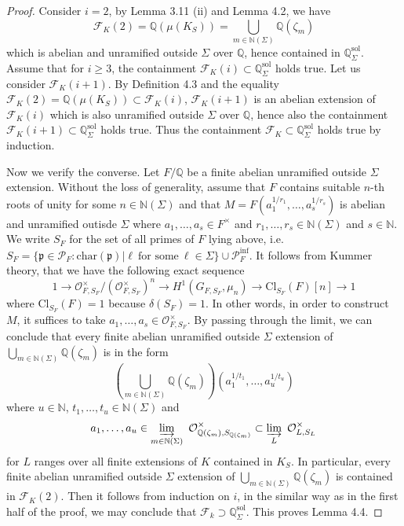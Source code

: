 \documentclass{article}
\theoremstyle{plain}
\theoremstyle{definition}
\theoremstyle{remark}
\begin{document}
\begin{proof}
Consider $i = 2$, by Lemma 3.11 (ii) and Lemma 4.2, we have
$$
\mathcal{F}_K(2) = \mathbb Q(\mu(K_S)) = \bigcup_{m \in \mathbb N(\Sigma)} \mathbb Q(\zeta_m)
$$
which is abelian and unramified outside $\Sigma$ over $\mathbb Q$, hence contained in $\mathbb Q_{\Sigma}^{\text{sol}}$. Assume that for $i \geq 3$, the containment $\mathcal{F}_K(i) \subset \mathbb Q_{\Sigma}^{\text{sol}}$ holds true. Let us consider $\mathcal{F}_K(i+1)$. By Definition 4.3 and the equality $\mathcal{F}_K(2) = \mathbb Q(\mu(K_S)) \subset \mathcal{F}_K(i)$, $\mathcal{F}_K(i+1)$ is an abelian extension of $\mathcal{F}_K(i)$ which is also unramified outside $\Sigma$ over $\mathbb Q$, hence also the containment $\mathcal{F}_K(i+1) \subset \mathbb Q_{\Sigma}^{\text{sol}}$ holds true. Thus the containment $\mathcal{F}_K \subset \mathbb Q_{\Sigma}^{\text{sol}}$ holds true by induction. \par 
Now we verify the converse. Let $F/\mathbb Q$ be a finite abelian unramified outside $\Sigma$ extension. Without the loss of generality, assume that $F$ contains suitable $n$-th roots of unity for some $n \in \mathbb N(\Sigma)$ and that $M = F(a_1^{1/r_1},\dots,a_s^{1/r_s})$ is abelian and unramified outisde $\Sigma$ where $a_1,\dots,a_s \in F^{\times}$ and $r_1,\dots,r_s \in \mathbb N(\Sigma)$ and $s \in \mathbb N$. We write $S_F$ for the set of all primes of $F$ lying above, i.e. $S_F = \{\mathfrak{p}\in \mathscr{P}_F: \text{char}(\mathfrak{p})|\ell~\text{for some}~\ell \in \Sigma\} \cup \mathscr{P}_F^{\text{inf}}$. It follows from Kummer theory, that we have the following exact sequence
$$
1 \to \mathcal{O}_{F,S_F}^{\times}/(\mathcal{O}_{F,S_F}^{\times})^n \to H^1(G_{F,S_F},\mu_n) \to \text{Cl}_{S_F}(F)[n] \to 1
$$
where $\text{Cl}_{S_F}(F) = 1$ because $\delta(S_F) = 1$. In other words, in order to construct $M$, it suffices to take $a_1,\dots,a_s \in \mathcal{O}_{F,S_F}^{\times}$. By passing through the limit, we can conclude that every finite abelian unramified outside $\Sigma$ extension of $\bigcup_{m \in \mathbb N(\Sigma)} \mathbb Q(\zeta_m)$ is in the form
$$
(\bigcup_{m \in \mathbb N(\Sigma)} \mathbb Q(\zeta_m))( a_1^{1/t_1},\dots,a_u^{1/t_u})
$$
where $u \in \mathbb N$, $t_1,\dots,t_u \in \mathbb N(\Sigma)$ and 
$$
a_1,\dots,a_u \in \varinjlim_{m \in \mathbb N(\Sigma)}~ \mathcal{O}_{\mathbb Q(\zeta_m),S_{\mathbb Q(\zeta_m)}}^{\times}  \subset \varinjlim_L~\mathcal{O}^{\times}_{L,S_L}
$$
for $L$ ranges over all finite extensions of $K$ contained in $K_S$. In particular, every finite abelian unramified outside $\Sigma$ extension of $\bigcup_{m \in \mathbb N(\Sigma)}\mathbb Q(\zeta_m)$ is contained in $\mathcal{F}_K(2)$. Then it follows from induction on $i$, in the similar way as in the first half of the proof, we may conclude that $\mathcal{F}_k \supset \mathbb Q_{\Sigma}^{\text{sol}}$. This proves Lemma 4.4.
\end{proof}
\end{document}
